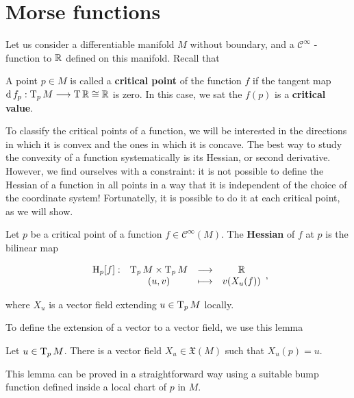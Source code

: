 \section{Morse functions}

Let us consider a differentiable manifold $M$ without boundary, and a $\mathcal{C}^{\infty}$ - function to $\mathbb{R}$ defined on this manifold. Recall that

\begin{deff}
	A point $p \in M$ is called a {\bf critical point} of the function $f$ if the tangent map $\operatorname d f_p : \operatorname T_pM \longrightarrow \operatorname T\mathbb{R} \cong \mathbb{R}$ is zero. In this case, we sat the $f(p)$ is a {\bf critical value}.
\end{deff}

To classify the critical points of a function, we will be interested in the directions in which it is convex and the ones in which it is concave. The best way to study the convexity of a function systematically is its Hessian, or second derivative. However, we find ourselves with a constraint: it is not possible to define the Hessian of a function in all points in a way that it is independent of the choice of the coordinate system! Fortunatelly, it is possible to do it at each critical point, as we will show.

\begin{deff}
	Let $p$ be a critical point of a function $f \in \mathcal{C}^{\infty}(M)$. The {\bf Hessian} of $f$ at $p$ is the bilinear map

\begin{displaymath}
	\begin{array}{rccc} \operatorname H_p[f] : & \operatorname T_pM \times \operatorname T_pM & \longrightarrow & \mathbb{R} \\ & (u,v) & \longmapsto & v(X_u(f)) \end{array} ,
\end{displaymath}

where $X_u$ is a vector field extending $u \in \operatorname T_pM$ locally.
\end{deff}

To define the extension of a vector to a vector field, we use this lemma

\begin{lema}
	Let $u \in \operatorname T_pM$. There is a vector field $X_u \in \mathfrak{X}(M)$ such that $X_u(p) = u$.
\end{lema}

This lemma can be proved in a straightforward way using a suitable bump function defined inside a local chart of $p$ in $M$.

